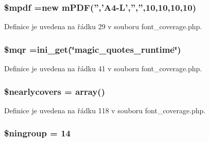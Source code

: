 \hypertarget{font__coverage_8php_ad028f81910d6cbab9b184d2214b3a8f8}{
\subsubsection[{\$mpdf}]{\setlength{\rightskip}{0pt plus 5cm}\$mpdf =new {\bf m\-P\-D\-F}('','A4-\/L','','',10,10,10,10)}}\label{font__coverage_8php_ad028f81910d6cbab9b184d2214b3a8f8}


Definice je uvedena na řádku 29 v souboru font\-\_\-coverage.\-php.

\hypertarget{font__coverage_8php_ad04a9e91774b9f9d3044e0c2b7636ca1}{
\subsubsection[{\$mqr}]{\setlength{\rightskip}{0pt plus 5cm}\$mqr =ini\-\_\-get(\char`\"{}magic\-\_\-quotes\-\_\-runtime\char`\"{})}}\label{font__coverage_8php_ad04a9e91774b9f9d3044e0c2b7636ca1}


Definice je uvedena na řádku 41 v souboru font\-\_\-coverage.\-php.

\hypertarget{font__coverage_8php_ade6f9afa46985ab699e0e5c9ca964210}{
\subsubsection[{\$nearlycovers}]{\setlength{\rightskip}{0pt plus 5cm}\$nearlycovers = array()}}\label{font__coverage_8php_ade6f9afa46985ab699e0e5c9ca964210}


Definice je uvedena na řádku 118 v souboru font\-\_\-coverage.\-php.

\hypertarget{font__coverage_8php_af1f5707cce79ac65e657d1c0528d63a6}{
\subsubsection[{\$ningroup}]{\setlength{\rightskip}{0pt plus 5cm}\$ningroup = 14}}\label{font__coverage_8php_af1f5707cce79ac65e657d1c0528d63a6}


